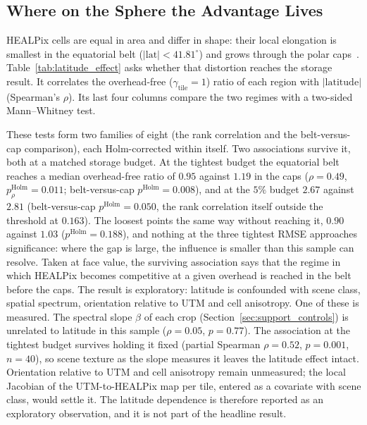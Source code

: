 \subsection{Where on the Sphere the Advantage Lives}
\label{sec:latitude}
HEALPix cells are equal in area and differ in shape: their local
elongation is smallest in the equatorial belt ($|\mathrm{lat}|<41.81^\circ$)
and grows through the polar caps~\cite{kmoch2022distortions}. Table~\ref{tab:latitude_effect}
asks whether that distortion reaches the storage result. It correlates
the overhead-free ($\gamma_{\mathrm{tile}}=1$) ratio of each region with
$|\mathrm{latitude}|$ (Spearman's $\rho$). Its last four columns
compare the two regimes with a two-sided Mann--Whitney test.



These tests form two families of eight (the rank correlation and the
belt-versus-cap comparison), each Holm-corrected within itself. Two associations survive it, both at a matched
storage budget. At the tightest budget the equatorial belt reaches a
median overhead-free ratio of $0.95$ against $1.19$ in the caps
($\rho=0.49$, $p^{\mathrm{Holm}}_\rho=0.011$; belt-versus-cap
$p^{\mathrm{Holm}}=0.008$), and at the $5\%$ budget $2.67$ against $2.81$
(belt-versus-cap $p^{\mathrm{Holm}}=0.050$, the rank correlation itself
outside the threshold at $0.163$). The loosest  points the
same way without reaching it, $0.90$ against $1.03$
($p^{\mathrm{Holm}}=0.188$), and nothing at the three tightest RMSE
 approaches significance: where the gap is large, the influence
is smaller than this sample can resolve. Taken at face value, the
surviving association says that the regime in which HEALPix becomes
competitive at a given overhead is reached in the belt before the caps.
The result is exploratory: latitude is confounded with scene class,
spatial spectrum, orientation relative to UTM and cell anisotropy. One of
these is measured. The spectral slope $\beta$ of each crop
(Section~\ref{sec:support_controls}) is unrelated to latitude in this
sample ($\rho=0.05$, $p=0.77$). The association at the tightest budget
survives holding it fixed (partial Spearman $\rho=0.52$, $p=0.001$,
$n=40$), so scene texture as the slope measures it leaves the latitude
effect intact. Orientation relative to UTM and cell anisotropy
remain unmeasured; the local Jacobian of the UTM-to-HEALPix map per
tile, entered as a covariate with scene class, would settle it. The latitude dependence is therefore reported as an exploratory
observation, and it is not part of the headline result.
